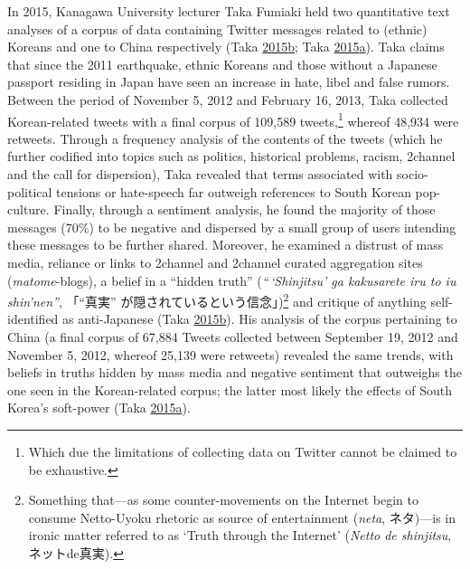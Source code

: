 \documentclass[10pt,british,A4paper,twoside]{memoir}
\begin{document}
In 2015, Kanagawa University lecturer Taka Fumiaki held two quantitative
text analyses of a corpus of data containing Twitter messages related to
(ethnic) Koreans and one to China respectively (Taka
\protect\hyperlink{ref-taka_twitter_2015-1}{2015}\protect\hyperlink{ref-taka_twitter_2015-1}{b};
Taka
\protect\hyperlink{ref-taka_twitter_2015}{2015}\protect\hyperlink{ref-taka_twitter_2015}{a}).
Taka claims that since the 2011 earthquake, ethnic Koreans and those
without a Japanese passport residing in Japan have seen an increase in
hate, libel and false rumors. Between the period of November 5, 2012 and
February 16, 2013, Taka collected Korean-related tweets with a final
corpus of 109,589 tweets,\footnote{Which due the limitations of
  collecting data on Twitter cannot be claimed to be exhaustive.}
whereof 48,934 were retweets. Through a frequency analysis of the
contents of the tweets (which he further codified into topics such as
politics, historical problems, racism, 2channel and the call for
dispersion), Taka revealed that terms associated with socio-political
tensions or hate-speech far outweigh references to South Korean
pop-culture. Finally, through a sentiment analysis, he found the
majority of those messages (70\%) to be negative and dispersed by a
small group of users intending these messages to be further shared.
Moreover, he examined a distrust of mass media, reliance or links to
2channel and 2channel curated aggregation sites (\emph{matome}-blogs), a
belief in a ``hidden truth'' (\emph{``\,`Shinjitsu' ga kakusarete iru to
iu shin'nen''}, 「``真実'' が隠されているという信念」)\footnote{Something
  that---as some counter-movements on the Internet begin to consume
  Netto-Uyoku rhetoric as source of entertainment (\emph{neta},
  ネタ)---is in ironic matter referred to as `Truth through the
  Internet' (\emph{Netto de shinjitsu}, ネットde真実).} and critique of
anything self-identified as anti-Japanese (Taka
\protect\hyperlink{ref-taka_twitter_2015-1}{2015}\protect\hyperlink{ref-taka_twitter_2015-1}{b}).
His analysis of the corpus pertaining to China (a final corpus of 67,884
Tweets collected between September 19, 2012 and November 5, 2012,
whereof 25,139 were retweets) revealed the same trends, with beliefs in
truths hidden by mass media and negative sentiment that outweighs the
one seen in the Korean-related corpus; the latter most likely the
effects of South Korea's soft-power (Taka
\protect\hyperlink{ref-taka_twitter_2015}{2015}\protect\hyperlink{ref-taka_twitter_2015}{a}).
\end{document}
